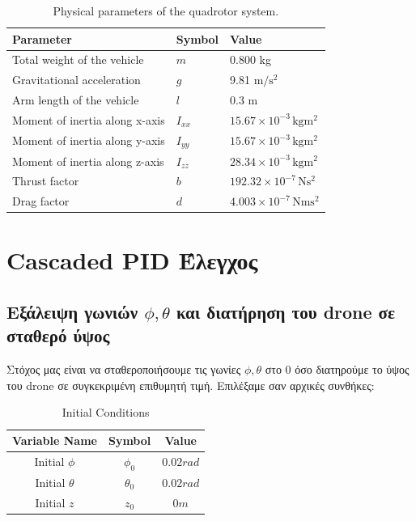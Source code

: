 \documentclass[a4paper,12pt]{article}
\begin{document}
\begin{table}[h!]
\centering
\caption{Physical parameters of the quadrotor system.}
\begin{tabular}{lll}
\toprule
\textbf{Parameter} & \textbf{Symbol} & \textbf{Value} \\
\midrule
Total weight of the vehicle         & \( m \)   & 0.800 kg \\
Gravitational acceleration          & \( g \)   & 9.81 
\(\si{\meter\per\second\squared}\) \\
Arm length of the vehicle           & \( l \)   & 0.3 m \\
Moment of inertia along x-axis      & \( I_{xx} \) & \( 15.67 \times 10^{-3} \, \si{\kilogram\meter\squared} \) \\
Moment of inertia along y-axis      & \( I_{yy} \) & \( 15.67 \times 10^{-3} \, \si{\kilogram\meter\squared} \) \\
Moment of inertia along z-axis      & \( I_{zz} \) & \( 28.34 \times 10^{-3} \, \si{\kilogram\meter\squared} \) \\
Thrust factor                       & \( b \)   & \( 192.32 \times 10^{-7} \, \si{\newton\second\squared} \) \\
Drag factor                         & \( d \)   & \( 4.003 \times 10^{-7} \, \si{\newton\meter\second\squared} \) \\
\bottomrule
\end{tabular}
\end{table}
\newpage









\section{Cascaded PID Έλεγχος}
\subsection{Εξάλειψη γωνιών $\phi, \theta$ και διατήρηση του drone σε σταθερό ύψος}\label{3.1}
Στόχος μας είναι να σταθεροποιήσουμε τις γωνίες $\phi, \theta$ στο $0$ όσο διατηρούμε το ύψος του drone σε συγκεκριμένη επιθυμητή τιμή. Επιλέξαμε σαν αρχικές συνθήκες:
\begin{table}[h!]
\centering
\caption{Initial Conditions}
\begin{tabular}{|c|c|c|}
\hline
\textbf{Variable Name} & \textbf{Symbol} & \textbf{Value} \\ \hline
Initial $\phi$ & $\phi_0$ & $0.02 rad$ \\ \hline
Initial $\theta$ & $\theta_0$  & $0.02 rad$ \\ \hline
Initial $z$ & $z_0$  & $0 m$ \\ \hline
\end{tabular}
\end{table}
\end{document}
